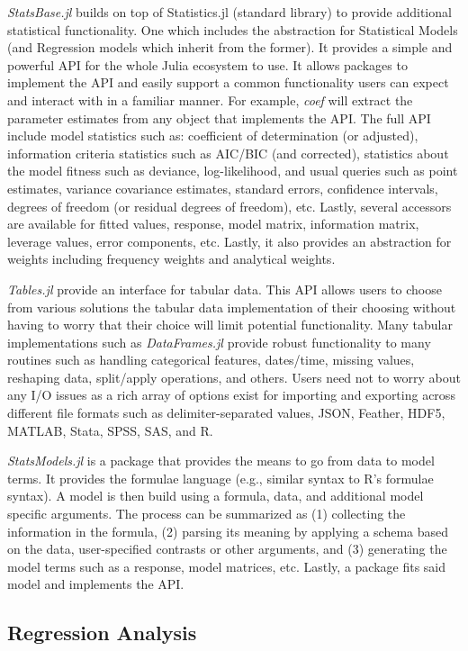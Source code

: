 \documentclass{juliacon}
\begin{document}
\textit{StatsBase.jl} builds on top of Statistics.jl (standard library) to provide additional statistical functionality. One which includes the abstraction for Statistical Models (and Regression models which inherit from the former). It provides a simple and powerful API for the whole Julia ecosystem to use. It allows packages to implement the API and easily support a common functionality users can expect and interact with in a familiar manner. For example, \textit{coef} will extract the parameter estimates from any object that implements the API. The full API include model statistics such as: coefficient of determination (or adjusted), information criteria statistics such as AIC/BIC (and corrected), statistics about the model fitness such as deviance, log-likelihood, and usual queries such as point estimates, variance covariance estimates, standard errors, confidence intervals, degrees of freedom (or residual degrees of freedom), etc. Lastly, several accessors are available for fitted values, response, model matrix, information matrix, leverage values, error components, etc. Lastly, it also provides an abstraction for weights including frequency weights and analytical weights.

\textit{Tables.jl} provide an interface for tabular data. This API allows users to choose from various solutions the tabular data implementation of their choosing without having to worry that their choice will limit potential functionality. Many tabular implementations such as \textit{DataFrames.jl} provide robust functionality to many routines such as handling categorical features, dates/time, missing values, reshaping data, split/apply operations, and others. Users need not to worry about any I/O issues as a rich array of options exist for importing and exporting across different file formats such as delimiter-separated values, JSON, Feather, HDF5, MATLAB, Stata, SPSS, SAS, and R.

\textit{StatsModels.jl} is a package that provides the means to go from data to model terms. It provides the formulae language (e.g., similar syntax to R's formulae syntax). A model is then build using a formula, data, and additional model specific arguments. The process can be summarized as (1) collecting the information in the formula, (2) parsing its meaning by applying a schema based on the data, user-specified contrasts or other arguments, and (3) generating the model terms such as a response, model matrices, etc. Lastly, a package fits said model and implements the API.

\subsection{Regression Analysis}
\end{document}
